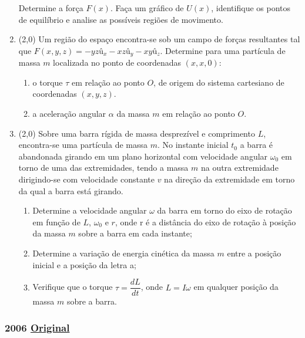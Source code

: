 \documentclass[12pt,a4paper]{article}
\newcommand{\original}[1]{\tiny \href{#1}{Original} \normalsize}
\begin{document}
\begin{enumerate}
Determine a força $F(x)$. Faça um gráfico de $U(x)$, identifique os pontos de equilíbrio e analise as possíveis regiões de movimento.

\item (2,0) Um região do espaço encontra-se sob um campo de forças resultantes tal que $F(x,y,z)=-yz \textrm{û}_x - xz \textrm{û}_y - xy \textrm{û}_z$. Determine
para uma partícula de massa $m$ localizada no ponto de coordenadas $(x,x,0)$:

\begin{enumerate}[label=\alph*)]
\item o torque $\tau$ em relação ao ponto $O$, de origem do sistema cartesiano de coordenadas $(x,y,z)$.
\item a aceleração angular $\alpha$ da massa $m$ em relação ao ponto $O$.
\end{enumerate}

\item (2,0) Sobre uma barra rígida de massa desprezível e comprimento $L$, encontra-se uma partícula de massa $m$. No instante inicial $t_0$ a barra é abandonada
girando em um plano horizontal com velocidade angular $\omega_0$ em torno de uma das extremidades, tendo a massa $m$ na outra extremidade dirigindo-se com velocidade constante
$v$ na direção da extremidade em torno da qual a barra está girando.

\begin{enumerate}[label=\alph*)]
\item Determine a velocidade angular $\omega$ da barra em torno do eixo de rotação em função de $L$, $\omega_0$ e $r$, onde 
r é a distância do eixo de rotação à posição da massa $m$ sobre a barra em cada instante;
\item Determine a variação de energia cinética da massa $m$ entre a posição inicial e a posição da letra a;
\item Verifique que o torque $\tau=\dfrac{dL}{dt}$, onde $L=I\omega$ em qualquer posição da massa $m$ sobre a barra.
\end{enumerate}

\end{enumerate}

\newpage

\subsubsection{2006 \original{https://drive.google.com/file/d/17yHvLz6wr_5k-LVKXSLpFrtEx-3I3wvr/view?usp=sharing}}
\end{document}
